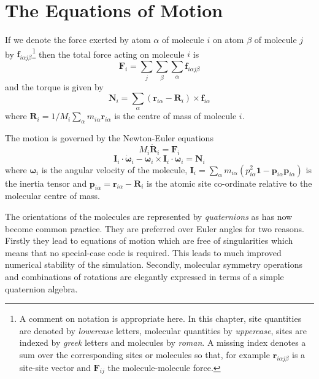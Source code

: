 \documentclass[a4paper,twoside]{report}
\newcommand{\bm}[1]{\mathbf{#1}}
\begin{document}
\section{The Equations of Motion}  %
If we denote the force exerted by atom $\alpha$ of molecule $i$ on
atom $\beta$ of molecule $j$ by $\bm{f}_{i\alpha j\beta}$\footnote{A
comment on notation is appropriate here.  In this chapter, site
quantities are denoted by \emph{lowercase} letters, molecular
quantities by \emph{uppercase}, sites are indexed by \emph{greek}
letters and molecules by \emph{roman}. A missing index denotes a sum
over the corresponding sites or molecules so that, for example
$\bm{r}_{i\alpha j\beta}$ is a site-site vector and $\bm{F}_{ij}$ the
molecule-molecule force.}  then the total force acting on molecule $i$
is
\begin{equation}
\label{eqn:comf}
\bm{F}_i = \sum_j \sum_\beta \sum_\alpha \bm{f}_{i\alpha j\beta}
\end{equation}
and the torque is given by
\begin{equation}
\label{eqn:comt}
\bm{N}_i = \sum_\alpha (\bm{r}_{i \alpha} - \bm{R}_{i}) 
\times\bm{f}_{i\alpha} 
\end{equation}
where $\bm{R}_{i} = 1/M_i \sum_\alpha
m_{i\alpha} \bm{r}_{i\alpha}$ is the centre of mass of molecule $i$.

The motion is governed by the Newton-Euler equations
\begin{equation}
M_i\ddot{\bm{R}}_i = \bm{F}_i \label{eqn:newton}
\end{equation}
\begin{equation}
  \bm{I}_i \cdot \dot{\bm\omega}_i - \bm\omega_i \times \bm{I}_i
  \cdot \bm\omega_i = \bm{N}_i \label{eqn:euler}
\end{equation}
where  $\bm\omega_i$ is the angular velocity of the molecule, 
$ \bm{I}_i = \sum_{\alpha} m_{i\alpha} 
( p_{i\alpha}^2 \bm{1} - \bm{p}_{i\alpha}\bm{p}_{i\alpha} ) $ 
is the inertia tensor and 
$\bm{p}_{i\alpha} = \bm{r}_{i\alpha} - \bm{R}_i $
is the atomic site co-ordinate relative to the molecular centre of mass.

\label{sec:quaternions}
The orientations of the molecules are represented by \emph{quaternions}
as  has now  become common  practice.   They are  preferred over Euler
angles for two reasons. Firstly they lead to equations of motion which
are  free  of singularities\cite{evans:77} which   means  that   no
special-case  code is required. This  leads to much improved numerical
stability      of  the  simulation\cite{evans:77b}.   Secondly,
molecular symmetry   operations   and  combinations of  rotations  are
elegantly expressed   in    terms  of     a     simple      quaternion
algebra\cite{evans:77b,pawley:85b}.
\end{document}
